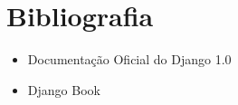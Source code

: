 %
%

\section{Bibliografia}
\label{sec:bib}

\begin{itemize}
\item Documentação Oficial do Django 1.0
\item Django Book
\end{itemize}

%
%
